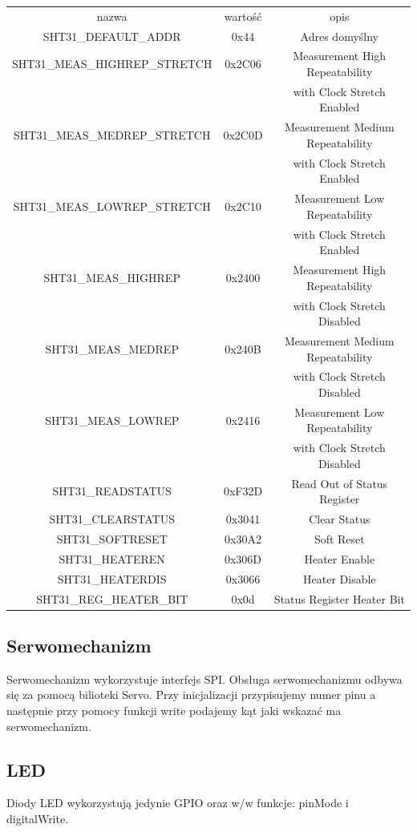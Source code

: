 \documentclass{classrep}
\begin{document}
\begin{center}
\begin{longtable}{ c c c }
nazwa & wartość & opis \\
SHT31\_DEFAULT\_ADDR & 0x44 & Adres domyślny \\
SHT31\_MEAS\_HIGHREP\_STRETCH & 0x2C06 & Measurement High Repeatability \\
 &  & with Clock Stretch Enabled \\
SHT31\_MEAS\_MEDREP\_STRETCH & 0x2C0D & Measurement Medium Repeatability \\
 &  & with Clock Stretch Enabled \\
SHT31\_MEAS\_LOWREP\_STRETCH & 0x2C10 & Measurement Low Repeatability \\
 &  & with Clock Stretch Enabled \\
SHT31\_MEAS\_HIGHREP & 0x2400 & Measurement High Repeatability \\
 &  & with Clock Stretch Disabled \\
SHT31\_MEAS\_MEDREP & 0x240B & Measurement Medium Repeatability \\
 &  & with Clock Stretch Disabled \\
SHT31\_MEAS\_LOWREP & 0x2416 & Measurement Low Repeatability \\
 &  & with Clock Stretch Disabled \\
SHT31\_READSTATUS & 0xF32D & Read Out of Status Register \\
SHT31\_CLEARSTATUS & 0x3041 & Clear Status \\
SHT31\_SOFTRESET & 0x30A2 & Soft Reset \\
SHT31\_HEATEREN & 0x306D & Heater Enable \\
SHT31\_HEATERDIS & 0x3066 & Heater Disable \\
SHT31\_REG\_HEATER\_BIT & 0x0d & Status Register Heater Bit  \\
\end{longtable}
\end{center}

\subsection {Serwomechanizm}
Serwomechanizm wykorzystuje interfejs SPI. Obsługa serwomechanizmu odbywa się za pomocą bilioteki Servo. Przy inicjalizacji przypisujemy numer pinu a następnie przy pomocy funkcji write podajemy kąt jaki wskazać ma serwomechanizm.

\subsection {LED}
Diody LED wykorzystują jedynie GPIO oraz w/w funkcje: pinMode i digitalWrite.
\end{document}
